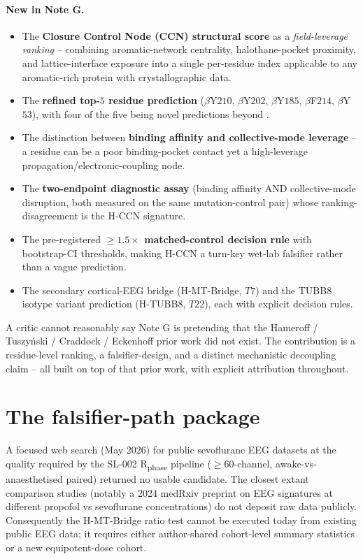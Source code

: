 \documentclass[11pt,a4paper]{article}
\begin{document}
\paragraph{New in Note G.}
\begin{itemize}\itemsep0pt
  \item The \textbf{Closure Control Node (CCN) structural score} as a
    \emph{field-leverage ranking} -- combining aromatic-network
    centrality, halothane-pocket proximity, and lattice-interface
    exposure into a single per-residue index applicable to any
    aromatic-rich protein with crystallographic data.
  \item The \textbf{refined top-$5$ residue prediction}
    ($\beta$Y$210$, $\beta$Y$202$, $\beta$Y$185$, $\beta$F$214$,
    $\beta$Y$53$), with four of the five being novel predictions
    beyond \citet{Craddock2012}.
  \item The distinction between \textbf{binding affinity and
    collective-mode leverage} -- a residue can be a poor binding-pocket
    contact yet a high-leverage propagation/electronic-coupling node.
  \item The \textbf{two-endpoint diagnostic assay} (binding affinity
    AND collective-mode disruption, both measured on the same
    mutation-control pair) whose ranking-disagreement is the H-CCN
    signature.
  \item The pre-registered \textbf{$\geq 1.5\times$ matched-control
    decision rule} with bootstrap-CI thresholds, making H-CCN a
    turn-key wet-lab falsifier rather than a vague prediction.
  \item The secondary cortical-EEG bridge (H-MT-Bridge, $T7$) and the
    TUBB$8$ isotype variant prediction (H-TUBB$8$, $T22$), each with
    explicit decision rules.
\end{itemize}

A critic cannot reasonably say Note G is pretending that the
Hameroff / Tuszy{\'n}ski / Craddock / Eckenhoff prior work did not
exist. The contribution is a residue-level ranking, a falsifier-design,
and a distinct mechanistic decoupling claim -- all built on top of
that prior work, with explicit attribution throughout.

\section{The falsifier-path package}\label{sec:falsifier_path}

A focused web search (May 2026) for public sevoflurane EEG datasets at
the quality required by the SL-002 R\textsubscript{phase} pipeline
($\geq 60$-channel, awake-vs-anaesthetised paired) returned no usable
candidate. The closest extant comparison studies (notably a 2024
medRxiv preprint on EEG signatures at different propofol vs sevoflurane
concentrations) do not deposit raw data publicly. Consequently the
H-MT-Bridge ratio test cannot be executed today from existing public
EEG data; it requires either author-shared cohort-level summary
statistics or a new equipotent-dose cohort.
\end{document}
